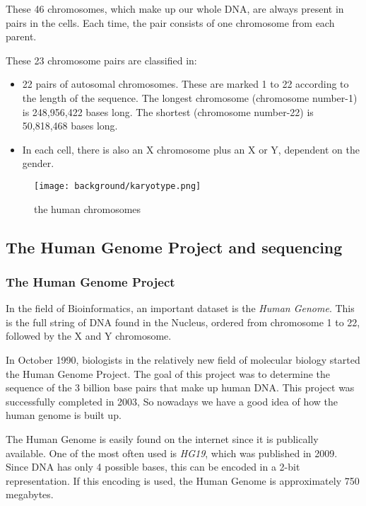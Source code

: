 These 46 chromosomes, which make up our whole DNA, are always present in pairs in the cells. Each time, the pair consists of one chromosome from each parent. 

These 23 chromosome pairs are classified in:
\begin{itemize}
	\item 22 pairs of autosomal chromosomes. These are marked 1 to 22 according to the length of the sequence. The longest chromosome (chromosome number-1) is 248,956,422 bases long. The shortest (chromosome number-22) is 50,818,468 bases long.
	\item In each cell, there is also an X chromosome plus an X or Y, dependent on the gender.
\end{itemize}


\begin{figure}[!ht]
	\centering
	\texttt{[image: background/karyotype.png]}
	\caption{the human chromosomes}
	\label{fig:karyotype}
\end{figure}


\subsection{The Human Genome Project and sequencing}

\subsubsection{The Human Genome Project}

In the field of Bioinformatics, an important dataset is the \emph{Human Genome}. This is the full string of DNA found in the Nucleus, ordered from chromosome 1 to 22, followed by the X and Y chromosome.

In October 1990, biologists in the relatively new field of molecular biology started the Human Genome Project. The goal of this project was to determine the sequence of the 3 billion base pairs that make up human DNA. This project was successfully completed in 2003, So nowadays we have a good idea of how the human genome is built up.

The Human Genome is easily found on the internet since it is publically available. One of the most often used is \emph{HG19}, which was published in 2009. Since DNA has only 4 possible bases, this can be encoded in a 2-bit representation. If this encoding is used, the Human Genome is approximately 750 megabytes.

